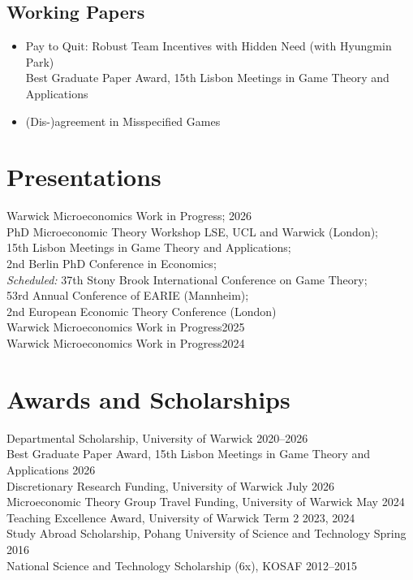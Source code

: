 \documentclass[11pt]{article}
\begin{document}
\subsection*{Working Papers}
\begin{itemize}[leftmargin=0em, nosep, itemsep=4pt]
\item  {Pay to Quit: Robust Team Incentives with Hidden Need} (with Hyungmin Park)\\
Best Graduate Paper Award, 15th Lisbon Meetings in Game Theory and Applications
\item   {(Dis-)agreement in Misspecified Games}
\end{itemize}

\setlength{\leftskip}{0em}
\section*{Presentations}
Warwick Microeconomics Work in Progress; \hfill 2026\\
PhD Microeconomic Theory Workshop LSE, UCL and Warwick (London);\\
15th Lisbon Meetings in Game Theory and Applications;\\
2nd Berlin PhD Conference in Economics;\\
{\textit{Scheduled:}} 
37th Stony Brook International Conference on Game Theory;\\
53rd Annual Conference of EARIE (Mannheim);\\
2nd European Economic Theory Conference (London)\\
Warwick Microeconomics Work in Progress\hfill 2025\\
Warwick Microeconomics Work in Progress\hfill 2024





\section*{Awards and Scholarships}
Departmental Scholarship, University of Warwick \hfill 2020--2026\\
Best Graduate Paper Award, 15th Lisbon Meetings in Game Theory and Applications \hfill  2026\\
Discretionary Research Funding, University of Warwick \hfill July 2026\\
Microeconomic Theory Group Travel Funding, University of Warwick \hfill May 2024\\
Teaching Excellence Award, University of Warwick \hfill Term 2 2023, 2024\\
Study Abroad Scholarship, Pohang University of Science and Technology \hfill Spring 2016\\
National Science and Technology Scholarship (6x), KOSAF \hfill 2012--2015
\end{document}
